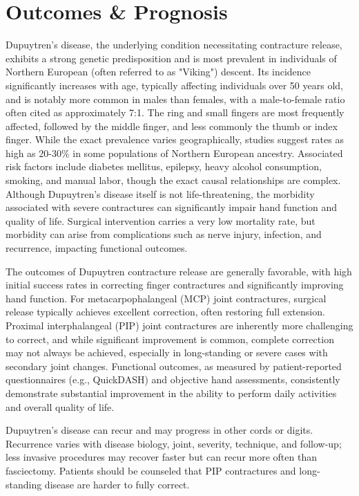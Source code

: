 \section*{Outcomes \& Prognosis}
Dupuytren's disease, the underlying condition necessitating contracture release, exhibits a strong genetic predisposition and is most prevalent in individuals of Northern European (often referred to as "Viking") descent. Its incidence significantly increases with age, typically affecting individuals over 50 years old, and is notably more common in males than females, with a male-to-female ratio often cited as approximately 7:1. The ring and small fingers are most frequently affected, followed by the middle finger, and less commonly the thumb or index finger. While the exact prevalence varies geographically, studies suggest rates as high as 20-30\% in some populations of Northern European ancestry. Associated risk factors include diabetes mellitus, epilepsy, heavy alcohol consumption, smoking, and manual labor, though the exact causal relationships are complex. Although Dupuytren's disease itself is not life-threatening, the morbidity associated with severe contractures can significantly impair hand function and quality of life. Surgical intervention carries a very low mortality rate, but morbidity can arise from complications such as nerve injury, infection, and recurrence, impacting functional outcomes.

The outcomes of Dupuytren contracture release are generally favorable, with high initial success rates in correcting finger contractures and significantly improving hand function. For metacarpophalangeal (MCP) joint contractures, surgical release typically achieves excellent correction, often restoring full extension. Proximal interphalangeal (PIP) joint contractures are inherently more challenging to correct, and while significant improvement is common, complete correction may not always be achieved, especially in long-standing or severe cases with secondary joint changes. Functional outcomes, as measured by patient-reported questionnaires (e.g., QuickDASH) and objective hand assessments, consistently demonstrate substantial improvement in the ability to perform daily activities and overall quality of life.

Dupuytren's disease can recur and may progress in other cords or digits. Recurrence varies with disease biology, joint, severity, technique, and follow-up; less invasive procedures may recover faster but can recur more often than fasciectomy. Patients should be counseled that PIP contractures and long-standing disease are harder to fully correct.

